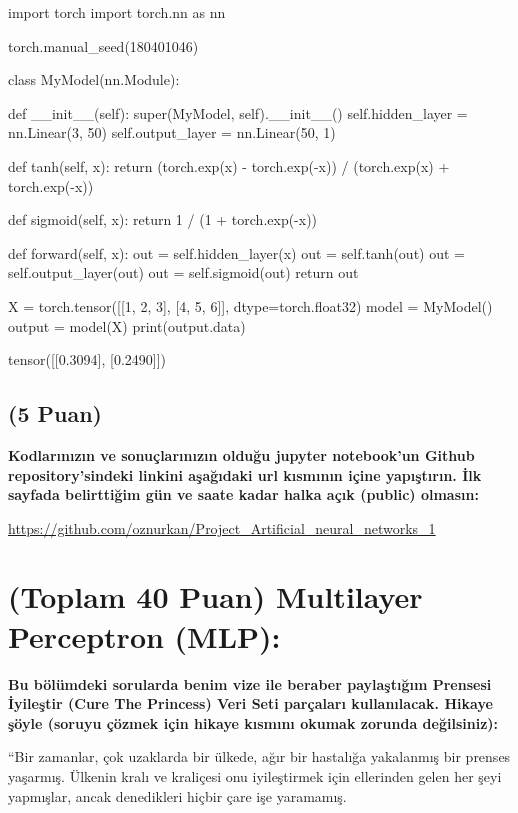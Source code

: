 \documentclass[11pt]{article}
\begin{document}
\begin{python}

import torch
import torch.nn as nn

torch.manual_seed(180401046)

class MyModel(nn.Module):

    def __init__(self):
        super(MyModel, self).__init__()
        self.hidden_layer = nn.Linear(3, 50)
        self.output_layer = nn.Linear(50, 1)

    def tanh(self, x):
        return (torch.exp(x) - torch.exp(-x)) / (torch.exp(x) + torch.exp(-x))

    def sigmoid(self, x):
        return 1 / (1 + torch.exp(-x))

    def forward(self, x):
        out = self.hidden_layer(x)
        out = self.tanh(out)
        out = self.output_layer(out)
        out = self.sigmoid(out)
        return out

X = torch.tensor([[1, 2, 3], [4, 5, 6]], dtype=torch.float32)
model = MyModel()
output = model(X)
print(output.data)

\end{python}

tensor([[0.3094],
        [0.2490]])

\subsection{(5 Puan)} \textbf{Kodlarınızın ve sonuçlarınızın olduğu jupyter notebook'un Github repository'sindeki linkini aşağıdaki url kısmının içine yapıştırın. İlk sayfada belirttiğim gün ve saate kadar halka açık (public) olmasın:}

\url{https://github.com/oznurkan/Project_Artificial_neural_networks_1}

\section{(Toplam 40 Puan) Multilayer Perceptron (MLP):} 
\textbf{Bu bölümdeki sorularda benim vize ile beraber paylaştığım Prensesi İyileştir (Cure The Princess) Veri Seti parçaları kullanılacak. Hikaye şöyle (soruyu çözmek için hikaye kısmını okumak zorunda değilsiniz):} 

``Bir zamanlar, çok uzaklarda bir ülkede, ağır bir hastalığa yakalanmış bir prenses yaşarmış. Ülkenin kralı ve kraliçesi onu iyileştirmek için ellerinden gelen her şeyi yapmışlar, ancak denedikleri hiçbir çare işe yaramamış.
\end{document}
